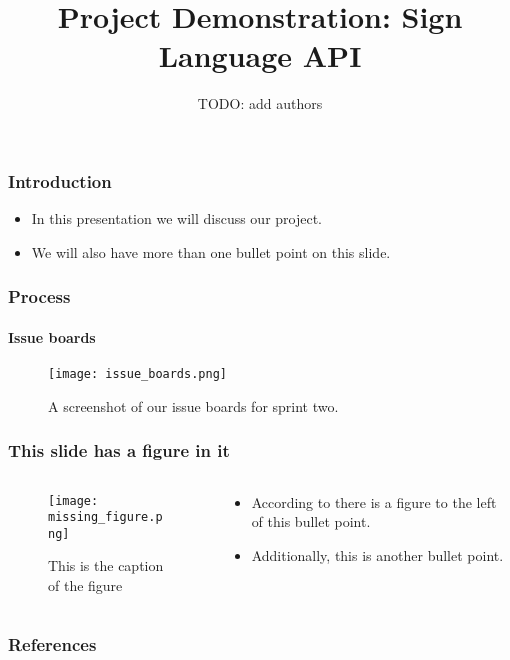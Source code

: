 \documentclass{beamer}
\title{Project Demonstration: Sign Language API}
\author{TODO: add authors}
\date{}
\begin{document}
\begin{frame}[t]
	\titlepage
\end{frame}

\begin{frame}[t]
	\frametitle{Introduction}
	\begin{itemize}
		\item In this presentation we will discuss our project.
		\item We will also have more than one bullet point on this slide.
	\end{itemize}
\end{frame}

\begin{frame}[t]
	\frametitle{Process}
	\framesubtitle{Issue boards}
	\begin{figure}
		\texttt{[image: issue\_boards.png]}
		\caption{A screenshot of our issue boards for sprint two.}
	\end{figure}
\end{frame}

\begin{frame}[t]
	\frametitle{This slide has a figure in it}
	\begin{columns}
	\begin{column}{0.5\textwidth}
		\begin{figure}
			\texttt{[image: missing\_figure.png]}
			\caption{This is the caption of the figure}
			\label{fig:missing_figure}
		\end{figure}
		\end{column}
		\begin{column}{0.5\textwidth}
			\begin{itemize}
				\item According to \cite{me} there is a figure to the left of this bullet point.
				\item Additionally, this is another bullet point.
			\end{itemize}
		\end{column}
	\end{columns}
\end{frame}

\begin{frame}[t]
	\frametitle{References}
	
	
\end{frame}
\end{document}
